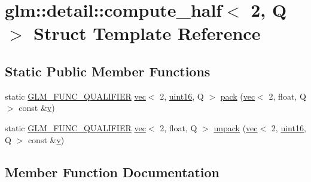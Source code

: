 \hypertarget{structglm_1_1detail_1_1compute__half_3_012_00_01_q_01_4}{}\section{glm\+:\+:detail\+:\+:compute\+\_\+half$<$ 2, Q $>$ Struct Template Reference}
\label{structglm_1_1detail_1_1compute__half_3_012_00_01_q_01_4}
\subsection*{Static Public Member Functions}
\begin{DoxyCompactItemize}
\item 
static \mbox{\hyperlink{setup_8hpp_a33fdea6f91c5f834105f7415e2a64407}{G\+L\+M\+\_\+\+F\+U\+N\+C\+\_\+\+Q\+U\+A\+L\+I\+F\+I\+ER}} \mbox{\hyperlink{structglm_1_1vec}{vec}}$<$ 2, \mbox{\hyperlink{namespaceglm_1_1detail_a47b2a7d006d187338e8031a352d1ce56}{uint16}}, Q $>$ \mbox{\hyperlink{structglm_1_1detail_1_1compute__half_3_012_00_01_q_01_4_aee41de18808e48e59c26b1fcd66fbc00}{pack}} (\mbox{\hyperlink{structglm_1_1vec}{vec}}$<$ 2, float, Q $>$ const \&\mbox{\hyperlink{_s_d_l__opengl_8h_a10a82eabcb59d2fcd74acee063775f90}{v}})
\item 
static \mbox{\hyperlink{setup_8hpp_a33fdea6f91c5f834105f7415e2a64407}{G\+L\+M\+\_\+\+F\+U\+N\+C\+\_\+\+Q\+U\+A\+L\+I\+F\+I\+ER}} \mbox{\hyperlink{structglm_1_1vec}{vec}}$<$ 2, float, Q $>$ \mbox{\hyperlink{structglm_1_1detail_1_1compute__half_3_012_00_01_q_01_4_a14c541423f621ba292c968245435c6a7}{unpack}} (\mbox{\hyperlink{structglm_1_1vec}{vec}}$<$ 2, \mbox{\hyperlink{namespaceglm_1_1detail_a47b2a7d006d187338e8031a352d1ce56}{uint16}}, Q $>$ const \&\mbox{\hyperlink{_s_d_l__opengl_8h_a10a82eabcb59d2fcd74acee063775f90}{v}})
\end{DoxyCompactItemize}


\subsection{Member Function Documentation}
\mbox{\label{structglm_1_1detail_1_1compute__half_3_012_00_01_q_01_4_aee41de18808e48e59c26b1fcd66fbc00}} 
